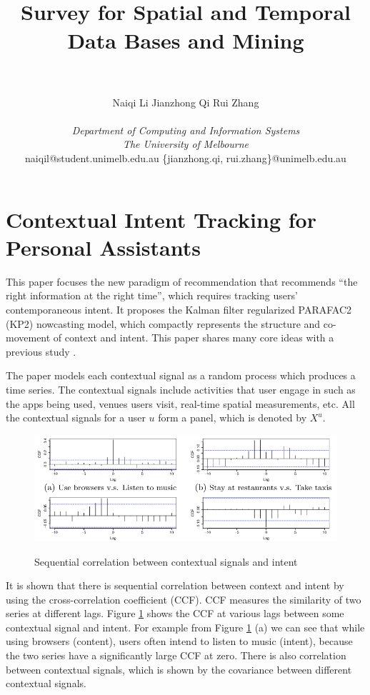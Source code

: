 \documentclass[paper=a4, fontsize=18pt]{article} %
\title{	
\normalfont \normalsize
\horrule{0.5pt} \\[0.4cm] %
\huge Survey for Spatial and Temporal Data Bases and Mining \\ %
\horrule{2pt} \\[0.5cm] %
}
\author{Naiqi Li \hspace*{0.5cm} Jianzhong Qi \hspace*{0.5cm} Rui Zhang\\
\vspace{-.1cm}\\
\emph{Department of Computing and Information Systems}\\
\emph{The University of Melbourne}\\
\small naiqil@student.unimelb.edu.au \{jianzhong.qi, rui.zhang\}@unimelb.edu.au}
\date{} %
\numberwithin{equation}{section} %
\numberwithin{figure}{section} %
\numberwithin{table}{section} %
\begin{document}
\maketitle %
\tableofcontents





\section{Contextual Intent Tracking for Personal Assistants \cite{SYWXMZ16}}

This paper focuses the new paradigm of recommendation that recommends ``the right information at the right time'', which requires tracking users' contemporaneous intent. It proposes the Kalman filter regularized PARAFAC2 (KP2) nowcasting model, which compactly represents the structure and co-movement of context and intent. This paper shares many core ideas with a previous study \cite{SYXMZ16}.

The paper models each contextual signal as a random process which produces a time series. The contextual signals include activities that user engage in such as the apps being used, venues users visit, real-time spatial measurements, etc. All the contextual signals for a user $u$ form a panel, which is denoted by $X^u$.

\begin{figure}[h]
  \centering
  \includegraphics[width=.8\linewidth]{8_22_ccf2.png}\\
  \caption{Sequential correlation between contextual signals and intent}\label{fig:ccf2}
\end{figure}

It is shown that there is sequential correlation between context and intent by using the cross-correlation coefficient (CCF). CCF measures the similarity of two series at different lags. Figure \ref{fig:ccf2} shows the CCF at various lags between some contextual signal and intent. For example from Figure \ref{fig:ccf2} (a) we can see that while using browsers (content), users often intend to listen to music (intent), because the two series have a significantly large CCF at zero.
There is also correlation between contextual signals, which is shown by the covariance between different contextual signals.
\end{document}
